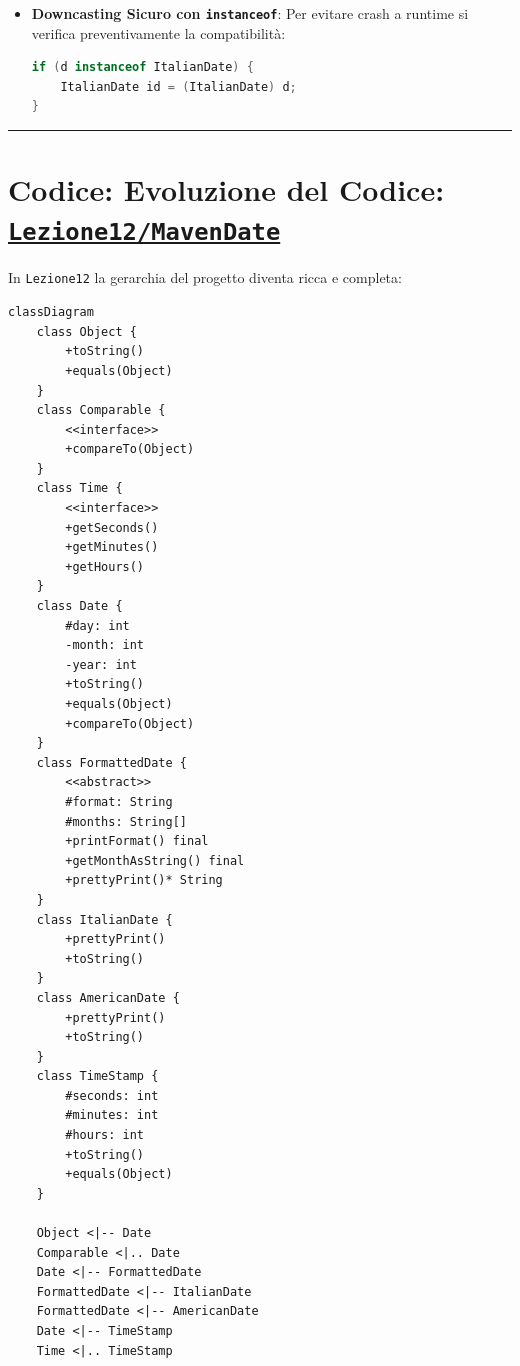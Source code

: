 \documentclass[11pt,a4paper,oneside]{report}
\newcommand{\passthrough}[1]{#1}
\providecommand{\tightlist}{\setlength{\itemsep}{0pt}\setlength{\parskip}{0pt}}
\begin{document}
\begin{itemize}
\begin{itemize}
    \begin{itemize}
    \tightlist
    \item
      Se l'oggetto concreto nello Heap è effettivamente un'istanza
      compatibile, il cast ha successo.
    \item
      Se l'oggetto concreto nello Heap è di tipo diverso (es. un
      \passthrough{\lstinline!Date!} generico o un
      \passthrough{\lstinline!AmericanDate!}), la JVM interrompe
      l'esecuzione e lancia una
      \textbf{\passthrough{\lstinline!ClassCastException!}}!
    \end{itemize}
  \item
    \textbf{Downcasting Sicuro con
    \passthrough{\lstinline!instanceof!}}: Per evitare crash a runtime
    si verifica preventivamente la compatibilità:

\begin{lstlisting}[language=Java]
if (d instanceof ItalianDate) {
    ItalianDate id = (ItalianDate) d;
}
\end{lstlisting}
  \end{itemize}
\end{itemize}

\begin{center}\rule{0.5\linewidth}{0.5pt}\end{center}

\section{\texorpdfstring{Codice: Evoluzione del Codice:
\href{file:///home/wally/Documenti/GitHub/Programmazione-II/25-26/Teoria-e-Esercitazioni/Codice-20260902/Lezione12/MavenDate}{\texttt{Lezione12/MavenDate}}}{Codice: Evoluzione del Codice: Lezione12/MavenDate}}\label{chap11_codice-evoluzione-del-codice-lezione12mavendate}

In \passthrough{\lstinline!Lezione12!} la gerarchia del progetto diventa
ricca e completa:

\begin{lstlisting}
classDiagram
    class Object {
        +toString()
        +equals(Object)
    }
    class Comparable {
        <<interface>>
        +compareTo(Object)
    }
    class Time {
        <<interface>>
        +getSeconds()
        +getMinutes()
        +getHours()
    }
    class Date {
        #day: int
        -month: int
        -year: int
        +toString()
        +equals(Object)
        +compareTo(Object)
    }
    class FormattedDate {
        <<abstract>>
        #format: String
        #months: String[]
        +printFormat() final
        +getMonthAsString() final
        +prettyPrint()* String
    }
    class ItalianDate {
        +prettyPrint()
        +toString()
    }
    class AmericanDate {
        +prettyPrint()
        +toString()
    }
    class TimeStamp {
        #seconds: int
        #minutes: int
        #hours: int
        +toString()
        +equals(Object)
    }

    Object <|-- Date
    Comparable <|.. Date
    Date <|-- FormattedDate
    FormattedDate <|-- ItalianDate
    FormattedDate <|-- AmericanDate
    Date <|-- TimeStamp
    Time <|.. TimeStamp
\end{lstlisting}
\end{document}
